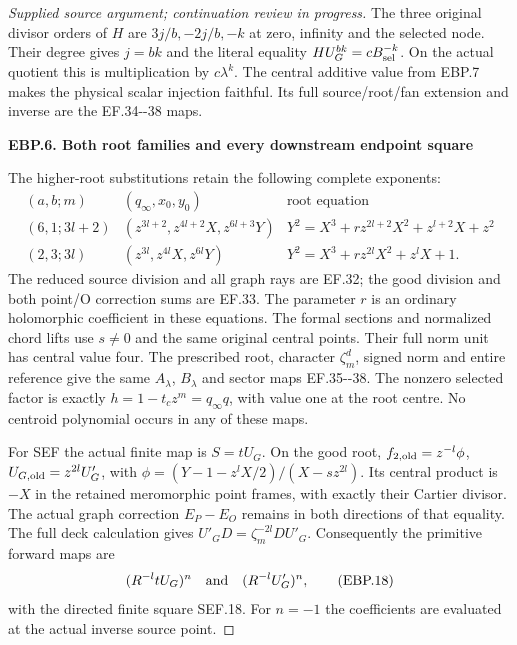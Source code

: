 \begin{proof}[Supplied source argument; continuation review in progress]
The three original divisor orders of \(H\) are
\(3j/b,-2j/b,-k\) at zero, infinity and the selected node.
Their degree gives \(j=bk\) and the literal equality
\(H U_G^{bk}=cB_{\rm sel}^{-k}\). On the actual quotient this
is multiplication by \(c\lambda^k\). The central additive value
from EBP.7 makes the physical scalar injection faithful. Its full
source/root/fan extension and inverse are the EF.34-\/-38 maps.

\par

\medskip\noindent\textbf{EBP.6. Both root families and every downstream endpoint square}

\par\nobreak

The higher-root substitutions retain the following complete exponents:
\[
\begin{array}{c|c|c}
(a,b;m)&(q_\infty,x_0,y_0)&\text{root equation}\\ \hline
(6,1;3l+2)&(z^{3l+2},z^{4l+2}X,z^{6l+3}Y)
 &Y^2=X^3+rz^{2l+2}X^2+z^{l+2}X+z^2\\
(2,3;3l)&(z^{3l},z^{4l}X,z^{6l}Y)
 &Y^2=X^3+rz^{2l}X^2+z^lX+1.
\end{array}
 \tag{EBP.17}
\]
The reduced source division and all graph rays are EF.32; the good
division and both point/O correction sums are EF.33. The parameter
\(r\) is an ordinary holomorphic coefficient in these equations.
The formal sections and normalized chord lifts use \(s\ne0\) and
the same original central points. Their full norm unit has central
value four. The prescribed root, character \(\zeta_m^d\), signed
norm and entire reference give the same \(A_\lambda\), \(B_\lambda\)
and sector maps EF.35-\/-38. The nonzero selected factor is exactly
\(h=1-t_cz^m=q_\infty q\), with value one at the root centre.
No centroid polynomial occurs in any of these maps.

For SEF the actual finite map is \(S=tU_G\). On the good root,
\(f_{2,\rm old}=z^{-l}\phi\),
\(U_{G,\rm old}=z^{2l}U'_G\), with
\(\phi=(Y-1-z^lX/2)/(X-sz^{2l})\).
Its central product is \(-X\) in the retained meromorphic point
frames, with exactly their Cartier divisor. The actual graph correction
\(E_P-E_O\) remains in both directions of that equality.
The full deck calculation gives
\(U'_G D=\zeta_m^{-2l}D U'_G\). Consequently the primitive
forward maps are
\[
 (R^{-l}tU_G)^n\quad\hbox{and}\quad(R^{-l}U'_G)^n,
 \tag{EBP.18}
\]
with the directed finite square SEF.18. For \(n=-1\) the
coefficients are evaluated at the actual inverse source point.


\end{proof}
